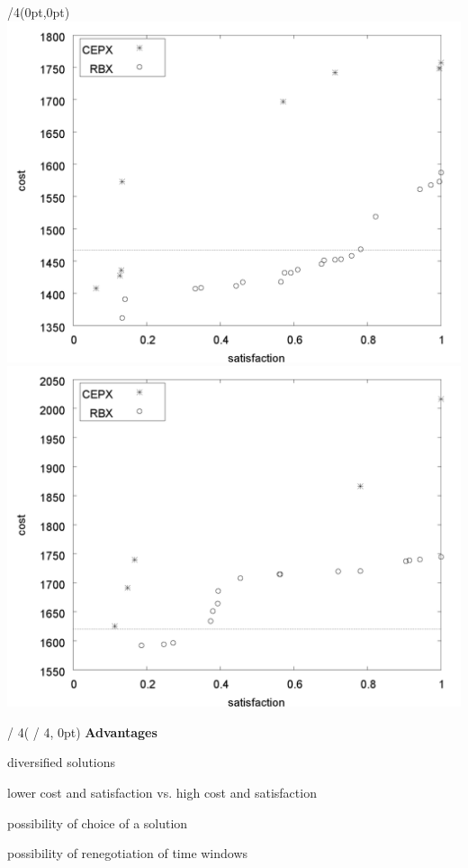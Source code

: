 \begin{textblock*}{/4}(0pt,0pt)%
\includegraphics[width=\posterboxwidth * 3 / 8]{bitmap/R102}\includegraphics[width=\posterboxwidth * 3 / 8]{bitmap/RC101}%
\end{textblock*}

\begin{textblock*}{\posterboxwidth / 4}( / 4, 0pt)%
\textbf{Advantages}
\begin{mylist}
\item diversified solutions
\item lower cost and satisfaction vs. high cost and satisfaction
\item possibility of choice of a solution
\item possibility of renegotiation of time windows
\end{mylist}%
\end{textblock*}

